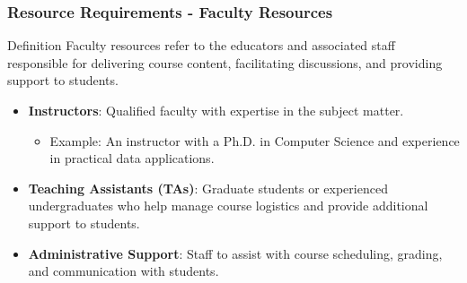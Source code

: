 \documentclass[aspectratio=169]{beamer}
\begin{document}
\begin{frame}[fragile]
    \frametitle{Resource Requirements - Faculty Resources}
    \begin{block}{Definition}
        Faculty resources refer to the educators and associated staff responsible for delivering course content, facilitating discussions, and providing support to students.
    \end{block}
    \begin{itemize}
        \item \textbf{Instructors}: Qualified faculty with expertise in the subject matter.
        \begin{itemize}
            \item Example: An instructor with a Ph.D. in Computer Science and experience in practical data applications.
        \end{itemize}
        \item \textbf{Teaching Assistants (TAs)}: Graduate students or experienced undergraduates who help manage course logistics and provide additional support to students.
        \item \textbf{Administrative Support}: Staff to assist with course scheduling, grading, and communication with students.
    \end{itemize}
\end{frame}
\end{document}
